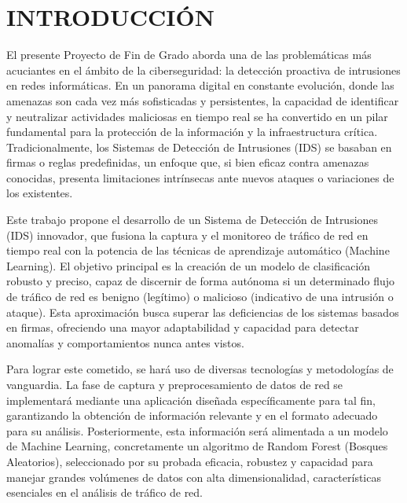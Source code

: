 
\chapter{INTRODUCCIÓN}  

El presente Proyecto de Fin de Grado aborda una de las problemáticas más acuciantes en el ámbito de la ciberseguridad: la detección proactiva de intrusiones en redes informáticas. En un panorama digital en constante evolución, donde las amenazas son cada vez más sofisticadas y persistentes, la capacidad de identificar y neutralizar actividades maliciosas en tiempo real se ha convertido en un pilar fundamental para la protección de la información y la infraestructura crítica. Tradicionalmente, los Sistemas de Detección de Intrusiones (IDS) se basaban en firmas o reglas predefinidas, un enfoque que, si bien eficaz contra amenazas conocidas, presenta limitaciones intrínsecas ante nuevos ataques o variaciones de los existentes.

Este trabajo propone el desarrollo de un Sistema de Detección de Intrusiones (IDS) innovador, que fusiona la captura y el monitoreo de tráfico de red en tiempo real con la potencia de las técnicas de aprendizaje automático (Machine Learning). El objetivo principal es la creación de un modelo de clasificación robusto y preciso, capaz de discernir de forma autónoma si un determinado flujo de tráfico de red es benigno (legítimo) o malicioso (indicativo de una intrusión o ataque). Esta aproximación busca superar las deficiencias de los sistemas basados en firmas, ofreciendo una mayor adaptabilidad y capacidad para detectar anomalías y comportamientos nunca antes vistos.

Para lograr este cometido, se hará uso de diversas tecnologías y metodologías de vanguardia. La fase de captura y preprocesamiento de datos de red se implementará mediante una aplicación diseñada específicamente para tal fin, garantizando la obtención de información relevante y en el formato adecuado para su análisis. Posteriormente, esta información será alimentada a un modelo de Machine Learning, concretamente un algoritmo de Random Forest (Bosques Aleatorios), seleccionado por su probada eficacia, robustez y capacidad para manejar grandes volúmenes de datos con alta dimensionalidad, características esenciales en el análisis de tráfico de red.

